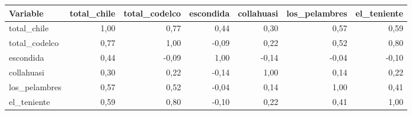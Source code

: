 \begin{tabular}{lrrrrrr}
\toprule
Variable & total\_chile & total\_codelco & escondida & collahuasi & los\_pelambres & el\_teniente \\
\midrule
total\_chile & 1,00 & 0,77 & 0,44 & 0,30 & 0,57 & 0,59 \\
total\_codelco & 0,77 & 1,00 & -0,09 & 0,22 & 0,52 & 0,80 \\
escondida & 0,44 & -0,09 & 1,00 & -0,14 & -0,04 & -0,10 \\
collahuasi & 0,30 & 0,22 & -0,14 & 1,00 & 0,14 & 0,22 \\
los\_pelambres & 0,57 & 0,52 & -0,04 & 0,14 & 1,00 & 0,41 \\
el\_teniente & 0,59 & 0,80 & -0,10 & 0,22 & 0,41 & 1,00 \\
\bottomrule
\end{tabular}
